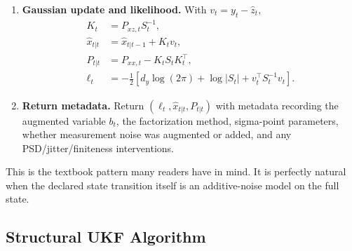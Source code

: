 \begin{enumerate}[label=\textbf{U\arabic*.}]
\begin{align}
    \end{align}
    where $R_t^{\mathrm{add}}=0$ if measurement noise was included in $b_t$ and
    $R_t^{\mathrm{add}}=R_t$ otherwise.
  \item \textbf{Gaussian update and likelihood.}  With
    $v_t=y_t-\hat z_t$,
    \begin{align}
      K_t &= P_{xz,t}S_t^{-1},\\
      \hat x_{t|t} &= \hat x_{t|t-1}+K_tv_t,\\
      P_{t|t} &= P_{xx,t}-K_tS_tK_t^\top,\\
      \ell_t &=
      -\frac{1}{2}
      \left[
        d_y\log(2\pi)+\log|S_t|+v_t^\top S_t^{-1}v_t
      \right].
    \end{align}
  \item \textbf{Return metadata.}  Return
    $(\ell_t,\hat x_{t|t},P_{t|t})$ with metadata recording the augmented
    variable $b_t$, the factorization method, sigma-point parameters, whether
    measurement noise was augmented or added, and any PSD/jitter/finiteness
    interventions.
\end{enumerate}
This is the textbook pattern many readers have in mind.  It is perfectly
natural when the declared state transition itself is an additive-noise model on
the full state.

\subsection{Structural UKF Algorithm}
\label{sec:bf-structural-ukf-algorithm}

